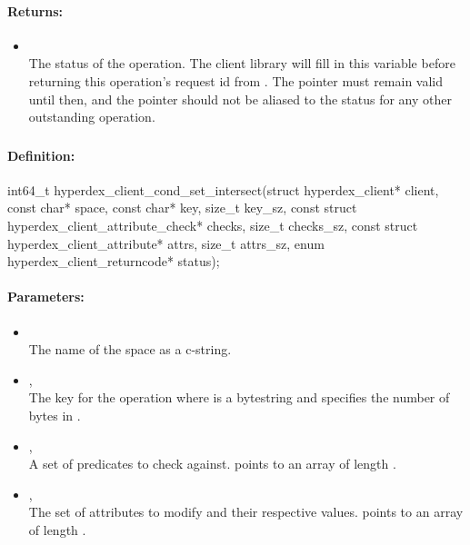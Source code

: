 \paragraph{Returns:}
\begin{itemize}[noitemsep]
\item {}\\
The status of the operation.  The client library will fill in this variable before returning this operation's request id from .  The pointer must remain valid until then, and the pointer should not be aliased to the status for any other outstanding operation.
\end{itemize}

\pagebreak
\subsubsection{}
\label{api:c:cond_set_intersect}


\paragraph{Definition:}
\begin{ccode}
int64_t hyperdex_client_cond_set_intersect(struct hyperdex_client* client,
        const char* space,
        const char* key, size_t key_sz,
        const struct hyperdex_client_attribute_check* checks, size_t checks_sz,
        const struct hyperdex_client_attribute* attrs, size_t attrs_sz,
        enum hyperdex_client_returncode* status);
\end{ccode}

\paragraph{Parameters:}
\begin{itemize}[noitemsep]
\item {}\\
The name of the space as a c-string.
\item {}, \\
The key for the operation where  is a bytestring and  specifies the number of bytes in .
\item {}, \\
A set of predicates to check against.   points to an array of length .
\item {}, \\
The set of attributes to modify and their respective values.   points to an array of length .
\end{itemize}

